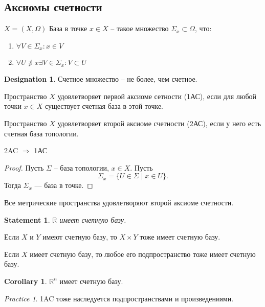 \documentclass[11pt]{book}
\newcommand{\R}{\mathbb{R}}
\theoremstyle{definition}
\theoremstyle{plain}
\theoremstyle{plain}
\newtheorem*{st}{Statement}
\theoremstyle{definition}
\newtheorem*{cor}{Corollary}
\newtheorem*{name}{Designation}
\theoremstyle{remark}
\newtheorem*{prac}{Practice}
\begin{document}
\subsection{Аксиомы счетности}
\begin{defn}
    $ X = (X , \Omega )$
    База в точке $ x \in  X$ -- такое множество $ \Sigma _x \subset \Omega $, что:
    \begin{enumerate}
	\item $ \forall V \in  \Sigma _x: x \in  V$
	\item $ \forall U \not\ni x \exists V \in  \Sigma _x: V \subset U$
    \end{enumerate}
\end{defn}
\begin{name}
    Счетное множество -- не более, чем счетное.
\end{name}
\begin{defn}
    Пространство $ X$ удовлетворяет первой аксиоме сетности (1АС), если для любой точки $ x \in  X$ существует счетная база в этой точке.
\end{defn}
\begin{defn}
    Пространство $ X$ удовлетворяет второй аксиоме счетности (2АС), если у него есть счетная база топологии.
\end{defn}
\begin{thm}
    2AC  $ \Rightarrow $ 1АС
\end{thm}
\begin{proof}
    Пусть $  \Sigma  $ -- база топологии, $ x \in X$. Пусть
    \[
	\Sigma_x = \{U \in  \Sigma \mid x \in  U\}
    .\]
    Тогда $ \Sigma_x$ ---  база в точке.
\end{proof}
\begin{thm}
    Все метрические пространства удовлетворяют второй аксиоме счетности.
\end{thm}
\begin{st}
    $ \R$ имеет счетную базу.
\end{st}
\begin{thm}
    Если $ X$ и $ Y$ имеют счетную базу, то $ X \times  Y$ тоже имеет счетную базу.
\end{thm}
\begin{thm}
    Если $ X$ имеет счетную базу, то любое его подпространство тоже имеет счетную базу.
\end{thm}
\begin{cor}
    $ \R^{n}$ имеет счетную базу.
\end{cor}
\begin{prac}
    1AC тоже наследуется подпространствами и произведениями.
\end{prac}
\end{document}
